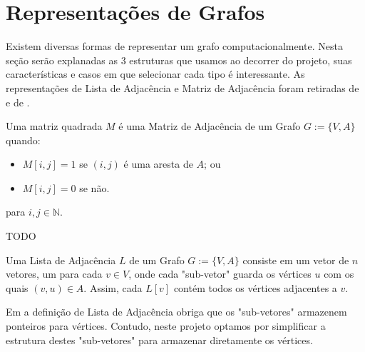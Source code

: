 \chapter{Representações de Grafos}
\label{ch:representation} %

Existem diversas formas de representar um grafo computacionalmente. Nesta seção serão explanadas as 3 estruturas que usamos ao decorrer do projeto, suas características e casos em que selecionar cada tipo é interessante.
As representações de Lista de Adjacência e Matriz de Adjacência foram retiradas de \cite{skiena2008algo} e de \cite{cormenEtAl2009algo}.

\begin{mydef}
  Uma matriz quadrada $M$ é uma Matriz de Adjacência de um Grafo $G := \{V, A\}$ quando:
  \begin{itemize}
    \item $M[i, j] = 1$ se $(i, j)$ é uma aresta de $A$; ou
    \item $M[i, j] = 0$ se não.
  \end{itemize}
  para $i, j \in \mathbb{N}$.
\end{mydef}

\begin{mydef}
  TODO
\end{mydef}

\begin{mydef}
  Uma Lista de Adjacência $L$ de um Grafo $G := \{V, A \}$ consiste em um vetor de $n$ vetores, um para cada $v \in V$, 
  onde cada "sub-vetor" guarda os vértices $u$ com os quais $(v, u) \in A$. 
  Assim, cada $L[v]$ contém todos os vértices adjacentes a $v$. 
\end{mydef}

Em \cite{skiena2008algo} a definição de Lista de Adjacência obriga que os "sub-vetores" armazenem ponteiros para vértices. Contudo, neste projeto optamos por simplificar a estrutura destes "sub-vetores" para armazenar diretamente os vértices. \\



